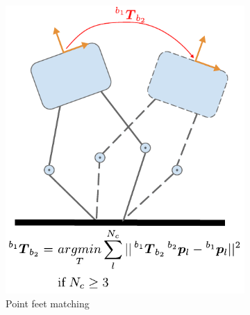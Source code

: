 \begin{figure}
    \centering
    \begin{subfigure}{.33\linewidth}
        \label{fig:kin_point_matching}
        \centering
        \includegraphics[width=\textwidth]{figures/robot_kinematic_types_point_matching.pdf}
        \caption{Point feet matching}
    \end{subfigure}%
        \hfill
    \begin{subfigure}{.33\linewidth}
        \label{fig:kin_point_vel}
        \centering

\end{subfigure}
\end{figure}

